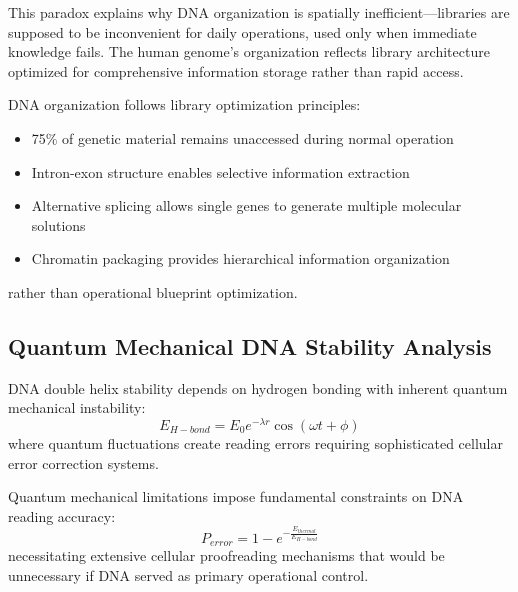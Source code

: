 \documentclass[11pt,a4paper]{article}
\begin{document}
This paradox explains why DNA organization is spatially inefficient—libraries are supposed to be inconvenient for daily operations, used only when immediate knowledge fails. The human genome's organization reflects library architecture optimized for comprehensive information storage rather than rapid access.

\begin{theorem}
DNA organization follows library optimization principles:
\begin{itemize}
\item 75\% of genetic material remains unaccessed during normal operation
\item Intron-exon structure enables selective information extraction
\item Alternative splicing allows single genes to generate multiple molecular solutions
\item Chromatin packaging provides hierarchical information organization
\end{itemize}
rather than operational blueprint optimization.
\end{theorem}

\subsection{Quantum Mechanical DNA Stability Analysis}

\begin{definition}
DNA double helix stability depends on hydrogen bonding with inherent quantum mechanical instability:
\begin{equation}
E_{H-bond} = E_0 e^{-\lambda r} \cos(\omega t + \phi)
\end{equation}
where quantum fluctuations create reading errors requiring sophisticated cellular error correction systems.
\end{definition}

\begin{theorem}
Quantum mechanical limitations impose fundamental constraints on DNA reading accuracy:
\begin{equation}
P_{error} = 1 - e^{-\frac{E_{thermal}}{E_{H-bond}}}
\end{equation}
necessitating extensive cellular proofreading mechanisms that would be unnecessary if DNA served as primary operational control.
\end{theorem}
\end{document}

